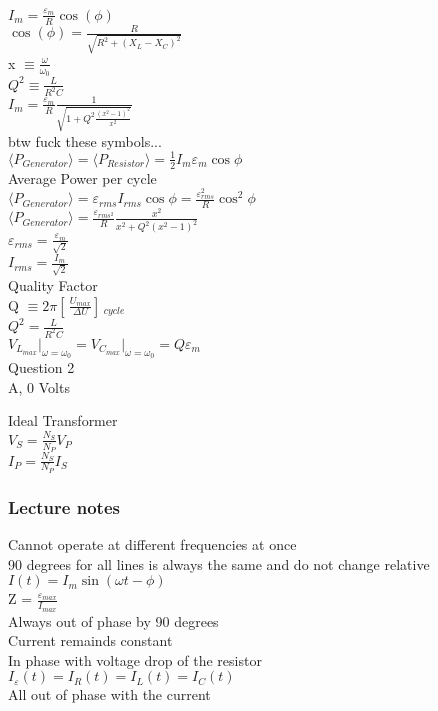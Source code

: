 \documentclass{article}
\begin{document}
\vspace{2mm}

\noindent
$I_m = \frac{\varepsilon_m}{R} \cos(\phi)$ \\
$\cos(\phi) = \frac{R}{\sqrt{R^2 + (X_L - X_C)^2}}$ \\
x $\equiv \frac{\omega}{\omega_0}$ \\
$Q^2 \equiv \frac{L}{R^2 C}$ \\
$I_m = \frac{\varepsilon_m}{R} \frac{1}{\sqrt{1 + Q^2 \frac{(x^2 - 1)^2}{x^2}}} $ \\
btw fuck these symbols... \\
$\langle P_{Generator} \rangle = \langle P_{Resistor} \rangle = \frac{1}{2} I_m \varepsilon_m \cos \phi$ \\
Average Power per cycle \\
$\langle P_{Generator} \rangle = \varepsilon_{rms} I_{rms} \cos \phi = \frac{\varepsilon_{rms}^2}{R} \cos^2 \phi $ \\
$\langle P_{Generator} \rangle = \frac{\varepsilon_{rms^2}}{R} \frac{x^2}{x^2 + Q^2(x^2 - 1)^2}$ \\
$\varepsilon_{rms} = \frac{\varepsilon_m}{\sqrt{2}}$ \\
$I_{rms} = \frac{I_m}{\sqrt{2}}$ \\
Quality Factor \\
Q $\equiv 2\pi [\,\frac{U_{max}}{\Delta U} ]\,_{cycle}$ \\
$Q^2 = \frac{L}{R^2 C}$ \\
$V_{L_{max}} \vert_{\omega = \omega_0} = V_{C_{max}} \vert_{\omega = \omega_0} = Q \varepsilon_m$ \\
Question 2 \\
A, 0 Volts

\vspace{2mm}

\noindent
Ideal Transformer \\
$V_S = \frac{N_S}{N_P} V_P$ \\
$I_P = \frac{N_S}{N_P}I_S$

\subsubsection{Lecture notes}
\noindent
Cannot operate at different frequencies at once \\
90 degrees for all lines is always the same and do not change  relative \\
$I(t) = I_m \sin(\omega t - \phi)$ \\
Z = $\frac{\varepsilon_{max}}{I_{max}}$ \\
Always out of phase by 90 degrees \\
Current remainds constant \\
In phase with voltage drop of the resistor \\
$I_{\varepsilon}(t) = I_R(t) = I_L(t) = I_C(t)$ \\
All out of phase with the current 
\end{document}
